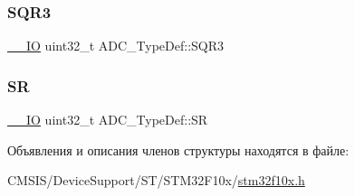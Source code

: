 \mbox{\label{struct_a_d_c___type_def_a51dbdba74c4d3559157392109af68fc6}} 
\subsubsection{\texorpdfstring{SQR3}{SQR3}}
{\footnotesize\ttfamily \mbox{\hyperlink{group___c_m_s_i_s___c_m3__core__definitions_gaec43007d9998a0a0e01faede4133d6be}{\+\_\+\+\_\+\+IO}} uint32\+\_\+t A\+D\+C\+\_\+\+Type\+Def\+::\+S\+Q\+R3}

\mbox{\label{struct_a_d_c___type_def_a9745df96e98f3cdc2d05ccefce681f64}} 
\subsubsection{\texorpdfstring{SR}{SR}}
{\footnotesize\ttfamily \mbox{\hyperlink{group___c_m_s_i_s___c_m3__core__definitions_gaec43007d9998a0a0e01faede4133d6be}{\+\_\+\+\_\+\+IO}} uint32\+\_\+t A\+D\+C\+\_\+\+Type\+Def\+::\+SR}



Объявления и описания членов структуры находятся в файле\+:\begin{DoxyCompactItemize}
\item 
C\+M\+S\+I\+S/\+Device\+Support/\+S\+T/\+S\+T\+M32\+F10x/\mbox{\hyperlink{stm32f10x_8h}{stm32f10x.\+h}}\end{DoxyCompactItemize}
